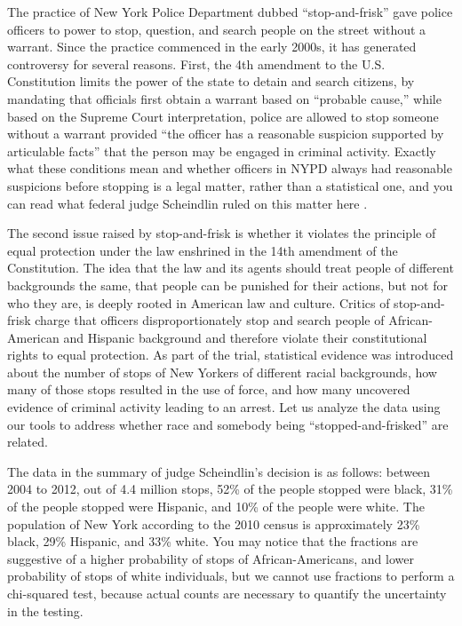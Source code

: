 \documentclass[
  letterpaper,
  DIV=11,
  numbers=noendperiod]{scrreprt}
\begin{document}
The practice of New York Police Department dubbed ``stop-and-frisk''
gave police officers to power to stop, question, and search people on
the street without a warrant. Since the practice commenced in the early
2000s, it has generated controversy for several reasons. First, the 4th
amendment to the U.S. Constitution limits the power of the state to
detain and search citizens, by mandating that officials first obtain a
warrant based on ``probable cause,'' while based on the Supreme Court
interpretation, police are allowed to stop someone without a warrant
provided ``the officer has a reasonable suspicion supported by
articulable facts'' that the person may be engaged in criminal activity.
Exactly what these conditions mean and whether officers in NYPD always
had reasonable suspicions before stopping is a legal matter, rather than
a statistical one, and you can read what federal judge Scheindlin ruled
on this matter here \cite{_stop-and-frisk_????}.

The second issue raised by stop-and-frisk is whether it violates the
principle of equal protection under the law enshrined in the 14th
amendment of the Constitution. The idea that the law and its agents
should treat people of different backgrounds the same, that people can
be punished for their actions, but not for who they are, is deeply
rooted in American law and culture. Critics of stop-and-frisk charge
that officers disproportionately stop and search people of
African-American and Hispanic background and therefore violate their
constitutional rights to equal protection. As part of the trial,
statistical evidence was introduced about the number of stops of New
Yorkers of different racial backgrounds, how many of those stops
resulted in the use of force, and how many uncovered evidence of
criminal activity leading to an arrest. Let us analyze the data using
our tools to address whether race and somebody being
``stopped-and-frisked'' are related.

The data in the summary of judge Scheindlin's decision is as follows:
between 2004 to 2012, out of 4.4 million stops, 52\% of the people
stopped were black, 31\% of the people stopped were Hispanic, and 10\%
of the people were white. The population of New York according to the
2010 census is approximately 23\% black, 29\% Hispanic, and 33\% white.
You may notice that the fractions are suggestive of a higher probability
of stops of African-Americans, and lower probability of stops of white
individuals, but we cannot use fractions to perform a chi-squared test,
because actual counts are necessary to quantify the uncertainty in the
testing.
\end{document}
